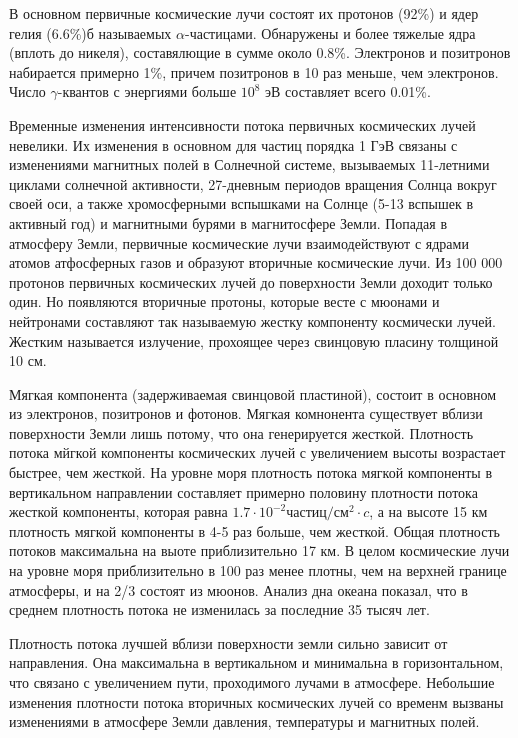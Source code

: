 \documentclass[14pt]{article}
\begin{document}
\vspace{0.5cm}
В основном первичные космические лучи состоят их протонов (92\%) и ядер гелия (6.6\%)б называемых $\alpha$-частицами. Обнаружены и более тяжелые ядра (вплоть до никеля), составялющие в сумме около 0.8\%.	Электронов и позитронов набирается примерно 1\%, причем позитронов в 10 раз меньше, чем электронов. Число $\gamma$-квантов с энергиями больше $10^8$ эВ составляет всего 0.01\%.

\vspace{0.5cm}
Временные изменения интенсивности потока первичных космических лучей невелики. Их изменения в основном для частиц порядка 1 ГэВ связаны с изменениями магнитных полей в Солнечной системе, вызываемых 11-летними циклами солнечной активности, 27-дневным периодов вращения Солнца вокруг своей оси, а также хромосферными вспышками на Солнце (5-13 вспышек в активный год) и магнитными бурями в магнитосфере Земли. Попадая в атмосферу Земли, первичные космические лучи взаимодействуют с ядрами атомов атфосферных газов и образуют вторичные космические лучи. Из 100 000 протонов первичных космических лучей до поверхности Земли доходит только один. Но появляются вторичные протоны, которые весте с мюонами и нейтронами составляют так называемую жестку компоненту космически лучей. Жестким называется излучение, прохоящее через свинцовую пласину толщиной 10 см. 

Мягкая компонента (задерживаемая свинцовой пластиной), состоит в основном из электронов, позитронов и фотонов. Мягкая комнонента существует вблизи поверхности Земли лишь потому, что она генерируется жесткой. Плотность потока мйгкой компоненты космических лучей с увеличением высоты возрастает быстрее, чем жесткой. На уровне моря плотность потока мягкой компоненты в вертикальном направлении составляет примерно половину плотности потока жесткой компоненты, которая равна $1.7 \cdot 10^{-2} \text{частиц}/\text{см}^2 \cdot c$, а на высоте 15 км плотность мягкой компоненты в 4-5 раз больше, чем жесткой. Общая плотность потоков максимальна на выоте приблизительно 17 км. В целом космические лучи на уровне моря приблизительно в 100 раз менее плотны, чем на верхней границе атмосферы, и на 2/3 состоят из мюонов. Анализ дна океана показал, что в среднем плотность потока не изменилась за последние 35 тысяч лет. 

Плотность потока лучшей вблизи поверхности земли сильно зависит от направления. Она максимальна в вертикальном и минимальна в горизонтальном, что связано с увеличением пути, проходимого лучами в атмосфере. Небольшие изменения плотности потока вторичных космических лучей со временм вызваны изменениями в атмосфере Земли давления, температуры и магнитных полей. 
\end{document}
